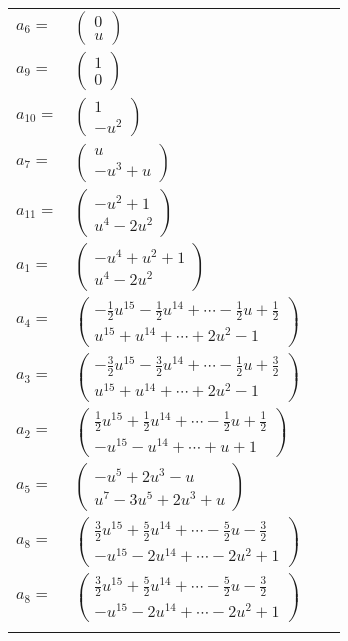 \documentclass[1p]{elsarticle_modified}
\theoremstyle{definition}
\begin{document}
\begin{tabular}{m{7pt} m{180pt} m{7pt} m{180pt} }
\flushright $a_{6}=$&$\begin{pmatrix}0\\u\end{pmatrix}$ \\
\flushright $a_{9}=$&$\begin{pmatrix}1\\0\end{pmatrix}$ \\
\flushright $a_{10}=$&$\begin{pmatrix}1\\- u^2\end{pmatrix}$ \\
\flushright $a_{7}=$&$\begin{pmatrix}u\\- u^3+u\end{pmatrix}$ \\
\flushright $a_{11}=$&$\begin{pmatrix}- u^2+1\\u^4-2 u^2\end{pmatrix}$ \\
\flushright $a_{1}=$&$\begin{pmatrix}- u^4+u^2+1\\u^4-2 u^2\end{pmatrix}$ \\
\flushright $a_{4}=$&$\begin{pmatrix}-\frac{1}{2} u^{15}-\frac{1}{2} u^{14}+\cdots-\frac{1}{2} u+\frac{1}{2}\\u^{15}+u^{14}+\cdots+2 u^2-1\end{pmatrix}$ \\
\flushright $a_{3}=$&$\begin{pmatrix}-\frac{3}{2} u^{15}-\frac{3}{2} u^{14}+\cdots-\frac{1}{2} u+\frac{3}{2}\\u^{15}+u^{14}+\cdots+2 u^2-1\end{pmatrix}$ \\
\flushright $a_{2}=$&$\begin{pmatrix}\frac{1}{2} u^{15}+\frac{1}{2} u^{14}+\cdots-\frac{1}{2} u+\frac{1}{2}\\- u^{15}- u^{14}+\cdots+u+1\end{pmatrix}$ \\
\flushright $a_{5}=$&$\begin{pmatrix}- u^5+2 u^3- u\\u^7-3 u^5+2 u^3+u\end{pmatrix}$ \\
\flushright $a_{8}=$&$\begin{pmatrix}\frac{3}{2} u^{15}+\frac{5}{2} u^{14}+\cdots-\frac{5}{2} u-\frac{3}{2}\\- u^{15}-2 u^{14}+\cdots-2 u^2+1\end{pmatrix}$\\ \flushright $a_{8}=$&$\begin{pmatrix}\frac{3}{2} u^{15}+\frac{5}{2} u^{14}+\cdots-\frac{5}{2} u-\frac{3}{2}\\- u^{15}-2 u^{14}+\cdots-2 u^2+1\end{pmatrix}$\\&\end{tabular}
\end{document}
